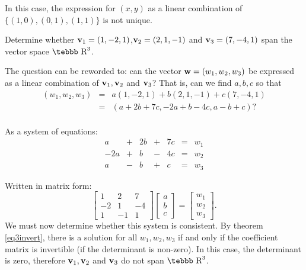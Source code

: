 \noindent In this case, the expression for $(x,y)$ as a linear
combination of $\{(1,0),(0,1),(1,1)\}$ is not unique.

\begin{example}
\label{exam5.span} Determine whether ${\bf v}_1=(1,-2,1)$,${\bf
v}_2=(2,1,-1)$ and ${\bf v}_3=(7,-4,1)$ span the vector space
$\mbox{\tebbb R}^3$.

The question can be reworded to:  can the vector ${\bf
w}=(w_1,w_2,w_3)$ be expressed as a linear combination of ${\bf
v}_1,{\bf v}_2$ and ${\bf v}_3$? That is, can we find $a,b,c$ so
that
\begin{eqnarray*}
(w_1,w_2,w_3)&=&a(1,-2,1)+b(2,1,-1)+c(7,-4,1)\\
&=&(a+2b+7c,-2a+b-4c,a-b+c)? \\
\end{eqnarray*}

As a system of equations:
$$ \begin{array}{rrrrrrr}
                a&+&2b&+&7c&=&w_1\\
              -2a&+& b&-&4c &=&w_2\\
                a&-&b&+&c&=&w_3 \end{array}  $$

Written in matrix form:
                      $$\left [ \begin{array}{rrr}
                                        1&2&7\\
                                        -2&1&-4\\
                                        1&-1&1 \end{array} \right ] \left [ \begin{array}{c} a\\b\\c \end{array}
                                        \right ] = \left [ \begin{array}{c} w_1\\w_2\\w_3 \end{array} \right ] .$$
We must now determine whether this system is consistent.  By
theorem \ref{eq3invert}, there is a solution for all $w_1,w_2,w_3$
if and only if the coefficient matrix is invertible (if the
determinant is non-zero).  In this case, the determinant is zero,
therefore ${\bf v}_1,{\bf v}_2$ and ${\bf v}_3$ do not span
$\mbox{\tebbb R}^3$.
\end{example}
